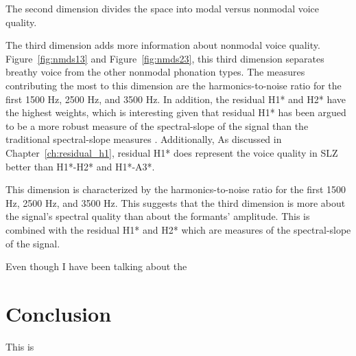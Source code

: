The second dimension divides the space into modal versus nonmodal voice quality.

The third dimension adds more information about nonmodal voice quality. Figure~\ref{fig:nmds13} and Figure~\ref{fig:nmds23}, this third dimension separates breathy voice from the other nonmodal phonation types. The measures contributing the most to this dimension are the harmonics-to-noise ratio for the first 1500 Hz, 2500 Hz, and 3500 Hz. In addition, the residual H1* and H2* have the highest weights, which is interesting given that residual H1* has been argued to be a more robust measure of the spectral-slope of the signal than the traditional spectral-slope measures \citep{chaiH1H2Acoustic2022,brinkerhoffResidualH1Measure2024}. Additionally, As discussed in Chapter~\ref{ch:residual_h1}, residual H1* does represent the voice quality in SLZ better than H1*-H2* and H1*-A3*.

This dimension is characterized by the harmonics-to-noise ratio for the first 1500 Hz, 2500 Hz, and 3500 Hz. This suggests that the third dimension is more about the signal's spectral quality than about the formants' amplitude. This is combined with the residual H1* and H2* which are measures of the spectral-slope of the signal.

Even though I have been talking about the 

\section{Conclusion} \label{sec:acousticlandscape:conclusion}

This is 